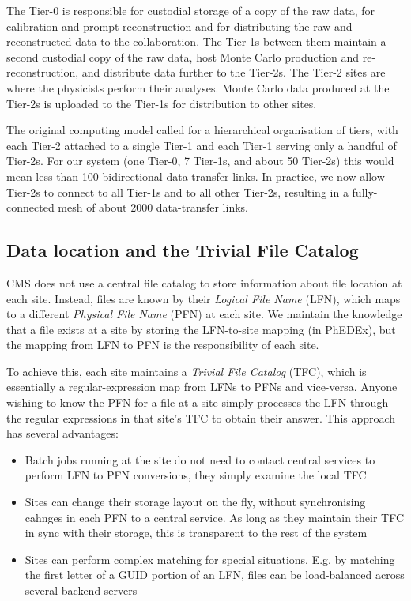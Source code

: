 The Tier-0 is responsible for custodial storage of a copy of the raw data, for calibration and prompt 
reconstruction and for distributing the raw and reconstructed data to the collaboration. The 
Tier-1s between them maintain a second custodial copy of the raw data, host Monte Carlo production and
re-reconstruction, and distribute data further to the Tier-2s.
The Tier-2 sites are where the physicists perform their analyses. Monte Carlo data 
produced at the Tier-2s is uploaded to the Tier-1s for distribution to other sites.

The original computing model \cite{CTDR} called for a hierarchical organisation of tiers, with each Tier-2 
attached to a single Tier-1 and each Tier-1 serving only a handful of Tier-2s. For our system (one 
Tier-0, 7 Tier-1s, and about 50 Tier-2s) this would mean less than 100 bidirectional data-transfer links. In 
practice, we now allow Tier-2s to connect to all Tier-1s and to all other Tier-2s, resulting in a 
fully-connected mesh of about 2000 data-transfer links.

\subsection{Data location and the Trivial File Catalog}
CMS does not use a central file catalog to store information about file location at each site. 
Instead, files are known by their {\it Logical File Name} (LFN), which maps to a different {\it 
Physical File Name} (PFN) at each site. We maintain the knowledge that a file exists at a site by 
storing the LFN-to-site mapping (in PhEDEx), but the mapping from LFN to PFN is the responsibility 
of each site.

To achieve this, each site maintains a {\it Trivial File Catalog} (TFC), which is essentially a 
regular-expression map from LFNs to PFNs and vice-versa. Anyone wishing to know the PFN for a file 
at a site simply processes the LFN through the regular expressions in that site's TFC to obtain 
their answer. This approach has several advantages:

\begin{itemize}
  \item Batch jobs running at the site do not need to contact central services to perform LFN to 
PFN conversions, they simply examine the local TFC
  \item Sites can change their storage layout on the fly, without synchronising cahnges in each PFN
to a central service. As long as they maintain their TFC in sync with their storage, this is 
transparent to the rest of the system
  \item Sites can perform complex matching for special situations. E.g. by matching the first 
letter of a GUID portion of an LFN, files can be load-balanced across several backend servers
\end{itemize}
